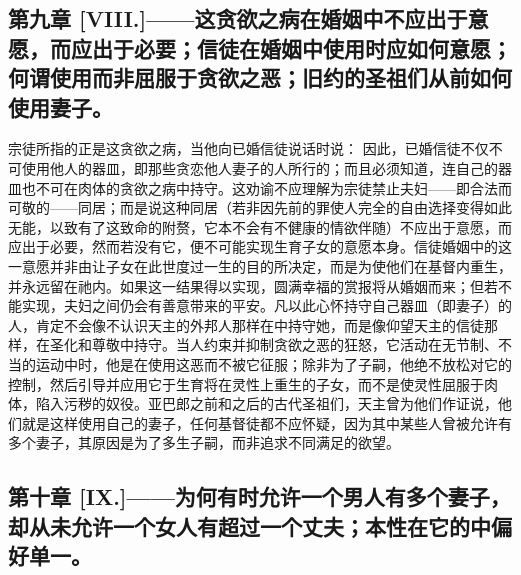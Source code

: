 \subsection{第九章 [VIII.]——这贪欲之病在婚姻中不应出于意愿，而应出于必要；信徒在婚姻中使用时应如何意愿；何谓使用而非屈服于贪欲之恶；旧约的圣祖们从前如何使用妻子。}

宗徒所指的正是这贪欲之病，当他向已婚信徒说话时说：  因此，已婚信徒不仅不可使用他人的器皿，即那些贪恋他人妻子的人所行的；而且必须知道，连自己的器皿也不可在肉体的贪欲之病中持守。这劝谕不应理解为宗徒禁止夫妇——即合法而可敬的——同居；而是说这种同居（若非因先前的罪使人完全的自由选择变得如此无能，以致有了这致命的附赘，它本不会有不健康的情欲伴随）不应出于意愿，而应出于必要，然而若没有它，便不可能实现生育子女的意愿本身。信徒婚姻中的这一意愿并非由让子女在此世度过一生的目的所决定，而是为使他们在基督内重生，并永远留在祂内。如果这一结果得以实现，圆满幸福的赏报将从婚姻而来；但若不能实现，夫妇之间仍会有善意带来的平安。凡以此心怀持守自己器皿（即妻子）的人，肯定不会像不认识天主的外邦人那样在中持守她，而是像仰望天主的信徒那样，在圣化和尊敬中持守。当人约束并抑制贪欲之恶的狂怒，它活动在无节制、不当的运动中时，他是在使用这恶而不被它征服；除非为了子嗣，他绝不放松对它的控制，然后引导并应用它于生育将在灵性上重生的子女，而不是使灵性屈服于肉体，陷入污秽的奴役。亚巴郎之前和之后的古代圣祖们，天主曾为他们作证说，他们就是这样使用自己的妻子，任何基督徒都不应怀疑，因为其中某些人曾被允许有多个妻子，其原因是为了多生子嗣，而非追求不同满足的欲望。\par


\subsection{第十章 [IX.]——为何有时允许一个男人有多个妻子，却从未允许一个女人有超过一个丈夫；本性在它的中偏好单一。}

